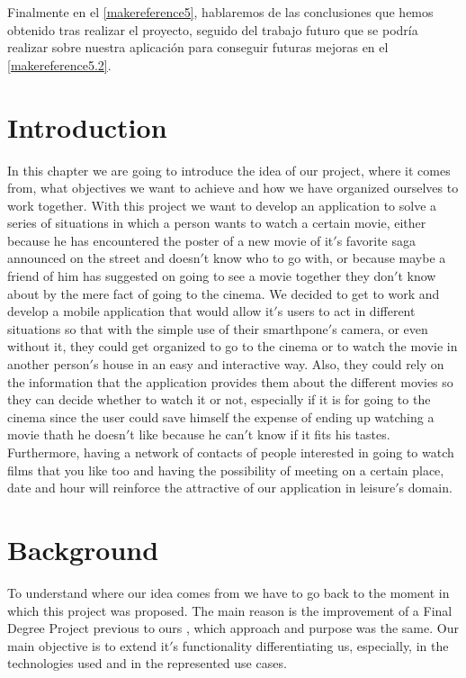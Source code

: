 Finalmente en el \autoref{makereference5}, hablaremos de las conclusiones que
 hemos obtenido tras realizar el proyecto, seguido del trabajo futuro que se podría realizar sobre nuestra
 aplicación para conseguir futuras mejoras en el \autoref{makereference5.2}.

\section{Introduction}

In this chapter we are going to introduce the idea of our project, where it comes from,
 what objectives we want to achieve and how we have organized ourselves to work 
together. With this project we want to develop an application to solve a series 
of situations in which a person wants to watch a certain movie, either because he 
has encountered the poster of a new movie of it$'$s favorite saga announced on the 
street and doesn$'$t know who to go with, or because maybe a friend of him has 
suggested on going to see a movie together they don$'$t know about 
by the mere fact of going to the cinema. We decided to get to work and develop a 
mobile application that would allow it$'$s users to act in different situations so 
that with the simple use of their smarthpone$'$s camera, or even without it, 
they could get organized to go to the cinema or to watch the movie in another 
person$'$s house in an easy and interactive way. Also, they could rely on 
the information that the application provides them about the different movies so they can decide 
whether to watch it or not, especially if it is for going to the cinema since the user could save himself 
the expense of ending up watching a movie thath he doesn$'$t like because he can$'$t know if it fits 
his tastes. Furthermore, having a network of contacts of people interested in going to watch films that
you like too and having the possibility of meeting on a certain place, date and hour will reinforce the attractive
of our application in leisure$'$s domain.

\section{Background}

To understand where our idea comes from we have to go back to the moment in which this project was proposed.
The main reason is the improvement of a Final Degree Project previous to ours \cite{TFGRA16}, which approach and purpose was the same. Our main 
objective is to extend it$'$s functionality differentiating us, especially, in the technologies used and in the represented use cases.

